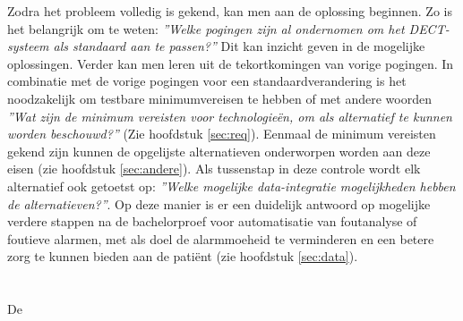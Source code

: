Zodra het probleem volledig is gekend, kan men aan de oplossing beginnen. Zo is het belangrijk om te weten: \textit{''Welke pogingen zijn al ondernomen om het DECT-systeem als standaard aan te passen?''} Dit kan inzicht geven in de mogelijke oplossingen. Verder kan men leren uit de tekortkomingen van vorige pogingen. In combinatie met de vorige pogingen voor een standaardverandering is het noodzakelijk om testbare minimumvereisen te hebben of met andere woorden \textit{''Wat zijn de minimum vereisten voor technologieën, om als alternatief te kunnen worden beschouwd?''} (Zie hoofdstuk \ref{sec:req}). 
Eenmaal de minimum vereisten gekend zijn kunnen de opgelijste alternatieven onderworpen worden aan deze eisen (zie hoofdstuk \ref{sec:andere}). Als tussenstap in deze controle wordt elk alternatief ook getoetst op: \textit{''Welke mogelijke data-integratie mogelijkheden hebben de alternatieven?''}. Op deze manier is er een duidelijk antwoord op mogelijke verdere stappen na de bachelorproef voor automatisatie van foutanalyse of foutieve alarmen, met als doel de alarmmoeheid te verminderen en een betere zorg te kunnen bieden aan de patiënt (zie hoofdstuk \ref{sec:data}).



\section{}%
\label{sec:setup}%
De 


